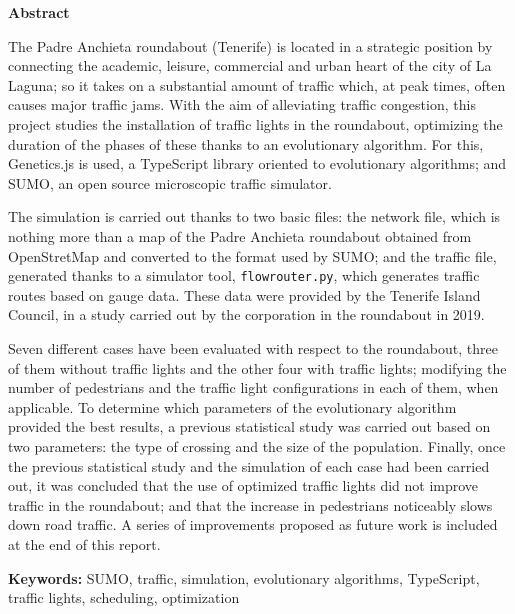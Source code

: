 \newpage
\pagestyle{empty}

\bigskip
\bigskip

\begin{center}
    \textbf{Abstract}
\end{center}

The Padre Anchieta roundabout (Tenerife) is located in a strategic position by connecting the academic, leisure, commercial and urban heart of the city of La Laguna; so it takes on a substantial amount of traffic which, at peak times, often causes major traffic jams. With the aim of alleviating traffic congestion, this project studies the installation of traffic lights in the roundabout, optimizing the duration of the phases of these thanks to an evolutionary algorithm. For this, Genetics.js is used, a TypeScript library oriented to evolutionary algorithms; and SUMO, an open source microscopic traffic simulator.

\medskip

The simulation is carried out thanks to two basic files: the network file, which is nothing more than a map of the Padre Anchieta roundabout obtained from OpenStretMap and converted to the format used by SUMO; and the traffic file, generated thanks to a simulator tool, \texttt{flowrouter.py}, which generates traffic routes based on gauge data. These data were provided by the Tenerife Island Council, in a study carried out by the corporation in the roundabout in 2019.

\medskip

Seven different cases have been evaluated with respect to the roundabout, three of them without traffic lights and the other four with traffic lights; modifying the number of pedestrians and the traffic light configurations in each of them, when applicable. To determine which parameters of the evolutionary algorithm provided the best results, a previous statistical study was carried out based on two parameters: the type of crossing and the size of the population. Finally, once the previous statistical study and the simulation of each case had been carried out, it was concluded that the use of optimized traffic lights did not improve traffic in the roundabout; and that the increase in pedestrians noticeably slows down road traffic. A series of improvements proposed as future work is included at the end of this report.

\medskip

\noindent \textbf{Keywords:} SUMO, traffic, simulation, evolutionary algorithms, TypeScript, traffic lights, scheduling, optimization

